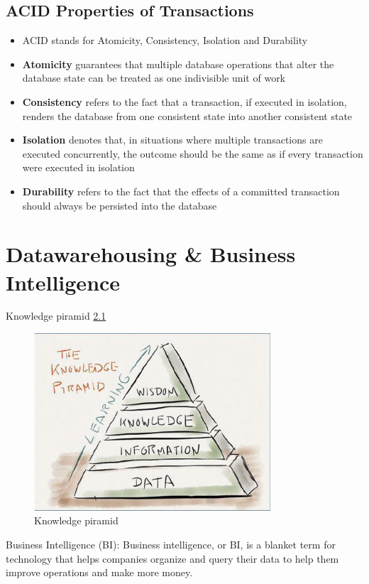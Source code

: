 \documentclass{report}
\begin{document}
\section{ACID Properties of Transactions}
\begin{itemize}
    \item ACID stands for Atomicity, Consistency, Isolation and Durability
    \item \textbf{Atomicity} guarantees that multiple database operations that alter the database state can be treated as one indivisible unit of work
    \item \textbf{Consistency} refers to the fact that a transaction, if executed in isolation, renders the database from one consistent state into another consistent state
    \item \textbf{Isolation} denotes that, in situations where multiple transactions are executed concurrently, the outcome should be the same as if every transaction were executed in isolation
    \item \textbf{Durability} refers to the fact that the effects of a
    committed transaction should always be persisted into
    the database
\end{itemize}
\chapter{Datawarehousing \& Business Intelligence}
Knowledge piramid \ref{fig:knowledge-piramid}
\begin{figure}
    \includegraphics[width=250pt]{./images/knowledge-piramid.png}
    \caption{\label{fig:knowledge-piramid}Knowledge piramid}
\end{figure}
Business Intelligence (BI): Business intelligence, or BI, is a blanket term for technology that helps companies organize and query their data to help them improve operations and make more money.
\end{document}
